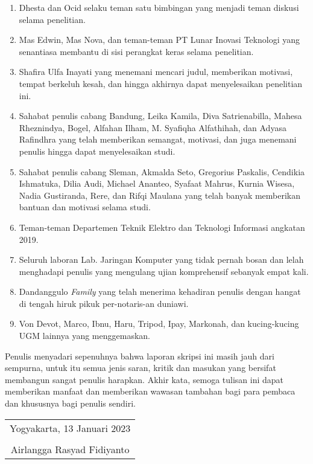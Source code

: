 \begin{enumerate}
	\item Dhesta dan Ocid selaku teman satu bimbingan yang menjadi teman diskusi selama penelitian.
	
	\item Mas Edwin, Mas Nova, dan teman-teman PT Lunar Inovasi Teknologi yang senantiasa membantu di sisi perangkat keras selama penelitian.
	
	\item Shafira Ulfa Inayati yang menemani mencari judul, memberikan motivasi, tempat berkeluh kesah, dan hingga akhirnya dapat menyelesaikan penelitian ini.
	
	\item Sahabat penulis cabang Bandung, Leika Kamila, Diva Satrienabilla, Mahesa Rheznindya, Bogel, Alfahan Ilham, M. Syafiqha Alfathihah, dan Adyasa Rafindhra yang telah memberikan semangat, motivasi, dan juga menemani penulis hingga dapat menyelesaikan studi.
	
	\item Sahabat penulis cabang Sleman, Akmalda Seto, Gregorius Paskalis, Cendikia Ishmatuka, Dilia Audi, Michael Ananteo, Syafaat Mahrus, Kurnia Wisesa, Nadia Gustiranda, Rere, dan Rifqi Maulana yang telah banyak memberikan bantuan dan motivasi selama studi.
	
	\item Teman-teman Departemen Teknik Elektro dan Teknologi Informasi angkatan 2019.
	
	\item Seluruh laboran Lab. Jaringan Komputer yang tidak pernah bosan dan lelah menghadapi penulis yang mengulang ujian komprehensif sebanyak empat kali.
	
	\item Dandanggulo \textit{Family} yang telah menerima kehadiran penulis dengan hangat di tengah hiruk pikuk per-notaris-an duniawi.
	
	\item Von Devot, Marco, Ibnu, Haru, Tripod, Ipay, Markonah, dan kucing-kucing UGM lainnya yang menggemaskan.

\end{enumerate}

Penulis menyadari sepenuhnya bahwa laporan skripsi ini masih jauh dari sempurna, untuk itu semua jenis saran, kritik dan masukan yang bersifat membangun sangat penulis harapkan. Akhir kata, semoga tulisan ini dapat memberikan manfaat dan memberikan wawasan tambahan bagi para pembaca dan khususnya bagi penulis sendiri.

\begin{flushright}
	\begin{tabular}{c}
		Yogyakarta, 13 Januari 2023 \\
		\vspace{1cm} \\
		Airlangga Rasyad Fidiyanto
	\end{tabular}
\end{flushright}